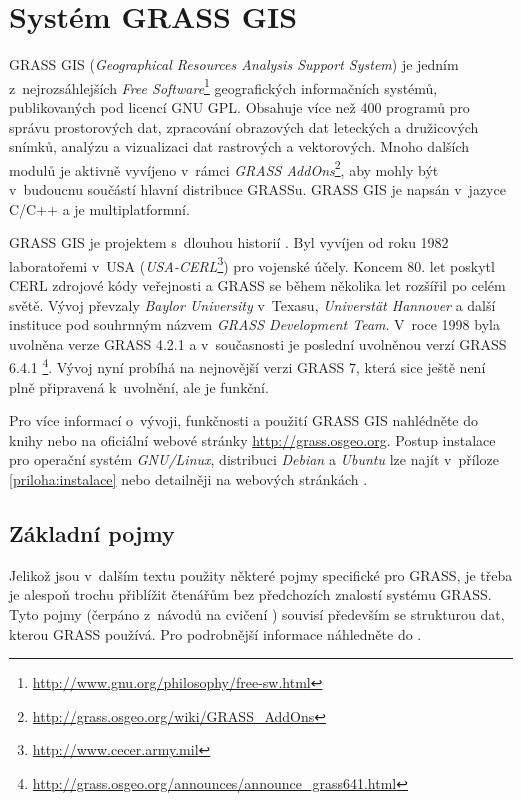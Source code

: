 \documentclass[a4paper,12pt,draft]{article}
\begin{document}
\section{Systém GRASS GIS}
\label{sec:grass}
GRASS GIS (\emph{Geographical Resources Analysis Support
System}) je jedním z~nejrozsáhlejších \emph{Free
Software}\footnote{\url{http://www.gnu.org/philosophy/free-sw.html}}
geografických informačních systémů,
publikovaných pod licencí GNU GPL. Obsahuje více
než 400 programů pro správu prostorových dat, zpracování obrazových dat
leteckých a družicových snímků, analýzu a vizualizaci dat rastrových
a vektorových. Mnoho dalších modulů je aktivně vyvíjeno v~rámci \emph{GRASS
AddOns}\footnote{\url{http://grass.osgeo.org/wiki/GRASS_AddOns}}, aby mohly být
v~budoucnu součástí hlavní distribuce GRASSu. GRASS GIS je napsán v~jazyce C/C++
a je multiplatformní.

GRASS GIS je projektem s~dlouhou historií \cite{grass_gis}. Byl vyvíjen od roku
1982 laboratořemi v~USA (\emph{USA-CERL}\footnote{\url{http://www.cecer.army.mil}})
pro vojenské účely. Koncem
80. let poskytl CERL zdrojové kódy veřejnosti a GRASS se během několika
let rozšířil po celém světě. Vývoj převzaly \emph{Baylor University}
v~Texasu, \emph{Universtät Hannover} a další instituce pod souhrnným názvem
\emph{GRASS Development Team}. V~roce 1998 byla uvolněna verze GRASS
4.2.1 a v~současnosti je poslední uvolněnou verzí GRASS 6.4.1%
\footnote{\url{http://grass.osgeo.org/announces/announce_grass641.html}}.
Vývoj nyní probíhá na nejnovější verzi GRASS 7, která sice ještě není plně
připravená k~uvolnění, ale je funkční.

Pro více informací o~vývoji, funkčnosti a použití GRASS GIS nahlédněte
do knihy \cite{grass_gis} nebo na oficiální webové stránky
\url{http://grass.osgeo.org}.
Postup instalace pro operační systém \emph{GNU/Linux}, distribuci \emph{Debian} a
\emph{Ubuntu} lze najít v~příloze \ref{priloha:instalace} nebo detailněji na
webových stránkách \cite{instalace}.

\subsection{Základní pojmy}
\label{sec:grass:pojmy}
Jelikož jsou v~dalším textu použity některé pojmy specifické pro GRASS,
je třeba je alespoň trochu přiblížit čtenářům bez předchozích
znalostí systému GRASS. Tyto pojmy
(čerpáno z~návodů na cvičení \cite{YZOD}) souvisí především se strukturou dat,
kterou GRASS používá. Pro podrobnější informace náhledněte do \cite{grass_gis}.
\end{document}
